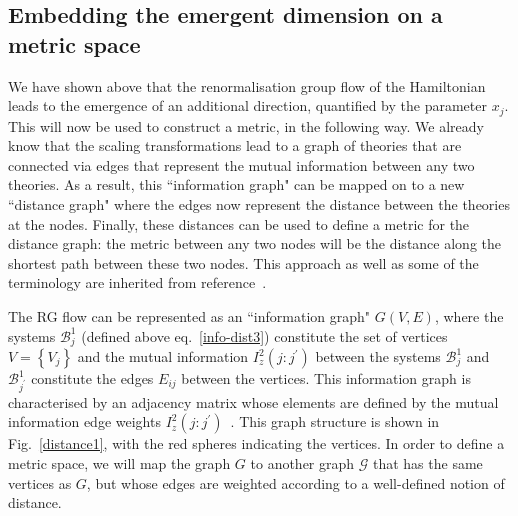 \subsection{Embedding the emergent dimension on a metric space}
\label{metric_subsection}
We have shown above that the renormalisation group flow of the Hamiltonian leads to the emergence of an additional direction, quantified by the parameter \(x_j\). This will now be used to construct a metric, in the following way. We already know that the scaling transformations lead to a graph of theories that are connected via edges that represent the mutual information between any two theories. As a result, this ``information graph" can be mapped on to a new ``distance graph" where the edges now represent the distance between the theories at the nodes. Finally, these distances can be used to define a metric for the distance graph: the metric between any two nodes will be the distance along the shortest path between these two nodes. This approach as well as some of the terminology are inherited from reference~\cite{cao_2017}.

The RG flow can be represented as an ``information graph" \(G(V,E)\), where the systems \(\mathcal{B}^1_{j}\) (defined above eq.~\eqref{info-dist3}) constitute the set of vertices \(V = \left\{ V_j \right\} \) and the mutual information \(I_z^2(j:j^\prime)\) between the systems \(\mathcal{B}^1_j\) and \(\mathcal{B}^1_{j^\prime}\) constitute the edges \(E_{ij}\) between the vertices. This information graph is characterised by an adjacency matrix whose elements are defined by the mutual information edge weights \(I_z^2(j:j^\prime)\)~\cite{singharoy2020}. This graph structure is shown in Fig.~\eqref{distance1}, with the red spheres indicating the vertices. In order to define a metric space, we will map the graph \(G\) to another graph \(\mathcal{G}\) that has the same vertices as \(G\), but whose edges are weighted according to a well-defined notion of distance.

